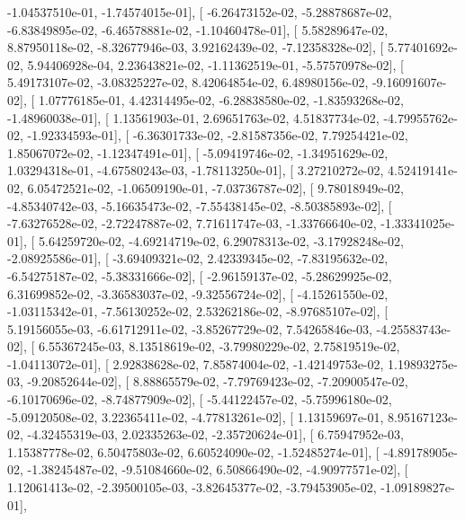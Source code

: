 \documentclass{article}
\begin{document}
         -1.04537510e-01,  -1.74574015e-01],
       [ -6.26473152e-02,  -5.28878687e-02,  -6.83849895e-02,
         -6.46578881e-02,  -1.10460478e-01],
       [  5.58289647e-02,   8.87950118e-02,  -8.32677946e-03,
          3.92162439e-02,  -7.12358328e-02],
       [  5.77401692e-02,   5.94406928e-04,   2.23643821e-02,
         -1.11362519e-01,  -5.57570978e-02],
       [  5.49173107e-02,  -3.08325227e-02,   8.42064854e-02,
          6.48980156e-02,  -9.16091607e-02],
       [  1.07776185e-01,   4.42314495e-02,  -6.28838580e-02,
         -1.83593268e-02,  -1.48960038e-01],
       [  1.13561903e-01,   2.69651763e-02,   4.51837734e-02,
         -4.79955762e-02,  -1.92334593e-01],
       [ -6.36301733e-02,  -2.81587356e-02,   7.79254421e-02,
          1.85067072e-02,  -1.12347491e-01],
       [ -5.09419746e-02,  -1.34951629e-02,   1.03294318e-01,
         -4.67580243e-03,  -1.78113250e-01],
       [  3.27210272e-02,   4.52419141e-02,   6.05472521e-02,
         -1.06509190e-01,  -7.03736787e-02],
       [  9.78018949e-02,  -4.85340742e-03,  -5.16635473e-02,
         -7.55438145e-02,  -8.50385893e-02],
       [ -7.63276528e-02,  -2.72247887e-02,   7.71611747e-03,
         -1.33766640e-02,  -1.33341025e-01],
       [  5.64259720e-02,  -4.69214719e-02,   6.29078313e-02,
         -3.17928248e-02,  -2.08925586e-01],
       [ -3.69409321e-02,   2.42339345e-02,  -7.83195632e-02,
         -6.54275187e-02,  -5.38331666e-02],
       [ -2.96159137e-02,  -5.28629925e-02,   6.31699852e-02,
         -3.36583037e-02,  -9.32556724e-02],
       [ -4.15261550e-02,  -1.03115342e-01,  -7.56130252e-02,
          2.53262186e-02,  -8.97685107e-02],
       [  5.19156055e-03,  -6.61712911e-02,  -3.85267729e-02,
          7.54265846e-03,  -4.25583743e-02],
       [  6.55367245e-03,   8.13518619e-02,  -3.79980229e-02,
          2.75819519e-02,  -1.04113072e-01],
       [  2.92838628e-02,   7.85874004e-02,  -1.42149753e-02,
          1.19893275e-03,  -9.20852644e-02],
       [  8.88865579e-02,  -7.79769423e-02,  -7.20900547e-02,
         -6.10170696e-02,  -8.74877909e-02],
       [ -5.44122457e-02,  -5.75996180e-02,  -5.09120508e-02,
          3.22365411e-02,  -4.77813261e-02],
       [  1.13159697e-01,   8.95167123e-02,  -4.32455319e-03,
          2.02335263e-02,  -2.35720624e-01],
       [  6.75947952e-03,   1.15387778e-02,   6.50475803e-02,
          6.60524090e-02,  -1.52485274e-01],
       [ -4.89178905e-02,  -1.38245487e-02,  -9.51084660e-02,
          6.50866490e-02,  -4.90977571e-02],
       [  1.12061413e-02,  -2.39500105e-03,  -3.82645377e-02,
         -3.79453905e-02,  -1.09189827e-01],
\end{document}
